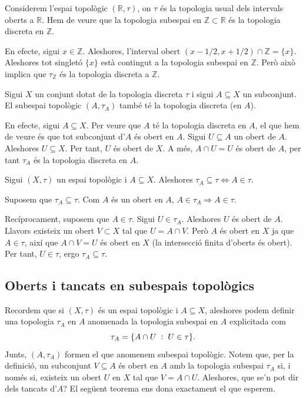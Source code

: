 \documentclass[../main.tex]{subfiles}
\begin{document}
\begin{ej}
\label{ej:topologiasubespai2} Considerem l'espai topològic $(\mathbb{R},\tau)$, on $\tau$ és la topologia usual dels intervals oberts a $\mathbb{R}$. Hem de veure que la topologia subespai en $\mathbb{Z}\subset\mathbb{R}$ és la topologia discreta en $\mathbb{Z}$.

En efecte, sigui $x\in\mathbb{Z}$. Aleshores, l'interval obert $(x-1/2,x+1/2)\cap\mathbb{Z} = \{x\}$. Aleshores tot singletó $\{x\} $ està contingut a la topologia subespai en $\mathbb{Z}$. Però això implica que $\tau_\mathbb{Z}$ és la topologia discreta a $\mathbb{Z}$.
\end{ej}

\begin{ej}
\label{ej:topologiasubespai3} Sigui $X$ un conjunt dotat de la topologia discreta $\tau$ i sigui $A\subseteq X$ un subconjunt. El subespai topològic $(A,\tau_A)$ també té la topologia discreta (en $A$).

En efecte, sigui $A\subseteq X$. Per veure que $A$ té la topologia discreta en $A$, el que hem de veure és que tot subconjunt d'$A$ és obert en $A$. Sigui $U\subseteq A$ un obert de $A$. Aleshores $U\subseteq X$. Per tant, $U$ és obert de $X$. A més, $A\cap U = U$ és obert de $A$, per tant $\tau_A$ és la topologia discreta en $A$.
\end{ej}

\begin{ej}
\label{ej:topologiasubespai4} Sigui $(X,\tau)$ un espai topològic i $A\subseteq X$. Aleshores $\tau_A\subseteq \tau \Leftrightarrow A\in\tau$.

Suposem que $\tau_A\subseteq\tau $. Com $A$ és un obert en $A$, $A\in\tau_A\Rightarrow A\in\tau$.

Recíprocament, suposem que $A\in\tau$. Sigui $U\in\tau_A$. Aleshores $U$ és obert de $A$. Llavors existeix un obert $V\subset X$ tal que $U = A\cap V$. Però $A$ és obert en $X$ ja que $A\in\tau$, així que $A\cap V = U$ és obert en $X$ (la intersecció finita d'oberts és obert). Per tant, $U\in\tau$, ergo $\tau_A\subseteq \tau$.
\end{ej}

\subsection{Oberts i tancats en subespais topològics}

Recordem que si $(X,\tau)$ és un espai topològic i $A\subseteq X$, aleshores podem definir una topologia $\tau_A$ en $A$ anomenada la topologia subespai en $A$ explicitada com
\begin{equation}
    \notag
    \tau_A = \{A\cap U\;:\;U\in\tau\} .
\end{equation}
Junts, $(A,\tau_A)$ formen el que anomenem subespai topològic. Notem que, per la definició, un subconjunt $V\subseteq A$ és obert en $A$ amb la topologia subespai $\tau_A$ si, i només si, existeix un obert $U$ en $X$ tal que $V = A\cap U$. Aleshores, que se'n pot dir dels tancats d'$A$? El següent teorema ens dona exactament el que esperem.
\end{document}
